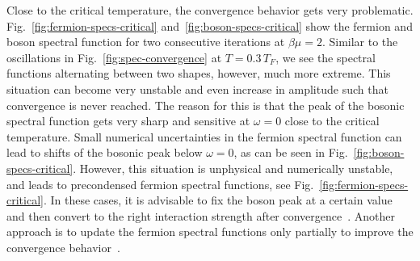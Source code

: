Close to the critical temperature, the convergence behavior gets very problematic. Fig.~\ref{fig:fermion-specs-critical} and~\ref{fig:boson-specs-critical} show the fermion and boson spectral function for two consecutive iterations at $\beta\mu=2$. Similar to the oscillations in Fig.~\ref{fig:spec-convergence} at $T=0.3\,T_F$, we see the spectral functions alternating between two shapes, however, much more extreme. This situation can become very unstable and even increase in amplitude such that convergence is never reached. The reason for this is that the peak of the bosonic spectral function gets very sharp and sensitive at $\omega=0$ close to the critical temperature. Small numerical uncertainties in the fermion spectral function can lead to shifts of the bosonic peak below $\omega=0$, as can be seen in Fig.~\ref{fig:boson-specs-critical}. However, this situation is unphysical and numerically unstable, and leads to precondensed fermion spectral functions, see Fig.~\ref{fig:fermion-specs-critical}. In these cases, it is advisable to fix the boson peak at a certain value and then convert to the right interaction strength after convergence~\cite{Lang2023}. Another approach is to update the fermion spectral functions only partially to improve the convergence behavior~\cite{Frank2018}.

